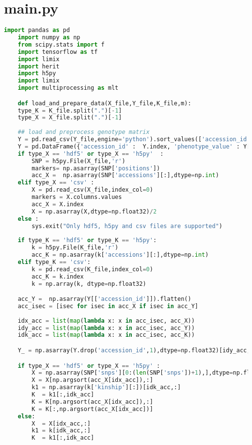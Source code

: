   \section{main.py}
  \begin{lstlisting}[language=Python]
    import pandas as pd 
    import numpy as np
    from scipy.stats import f
    import tensorflow as tf
    import limix
    import herit
    import h5py
    import limix
    import multiprocessing as mlt

    def load_and_prepare_data(X_file,Y_file,K_file,m):
    type_K = K_file.split(".")[-1]
    type_X = X_file.split(".")[-1]
    
    ## load and preprocess genotype matrix 
    Y = pd.read_csv(Y_file,engine='python').sort_values(['accession_id']).groupby('accession_id').mean()
    Y = pd.DataFrame({'accession_id' :  Y.index, 'phenotype_value' : Y[m]})
    if type_X == 'hdf5' or type_X == 'h5py'  :
        SNP = h5py.File(X_file,'r')
        markers= np.asarray(SNP['positions'])
        acc_X =  np.asarray(SNP['accessions'][:],dtype=np.int)
    elif type_X == 'csv' :
        X = pd.read_csv(X_file,index_col=0)
        markers = X.columns.values
        acc_X = X.index
        X = np.asarray(X,dtype=np.float32)/2
    else :
        sys.exit("Only hdf5, h5py and csv files are supported")
      
    if type_K == 'hdf5' or type_K == 'h5py':
        k = h5py.File(K_file,'r')
        acc_K = np.asarray(k['accessions'][:],dtype=np.int)
    elif type_K == 'csv':
        k = pd.read_csv(K_file,index_col=0)
        acc_K = k.index
        k = np.array(k, dtype=np.float32)

    acc_Y =  np.asarray(Y[['accession_id']]).flatten()
    acc_isec = [isec for isec in acc_X if isec in acc_Y]
        
    idx_acc = list(map(lambda x: x in acc_isec, acc_X))
    idy_acc = list(map(lambda x: x in acc_isec, acc_Y))
    idk_acc = list(map(lambda x: x in acc_isec, acc_K))

    Y_ = np.asarray(Y.drop('accession_id',1),dtype=np.float32)[idy_acc,:]

    if type_X == 'hdf5' or type_X == 'h5py' :
        X = np.asarray(SNP['snps'][0:(len(SNP['snps'])+1),],dtype=np.float32)[:,idx_acc].T
        X = X[np.argsort(acc_X[idx_acc]),:]
        k1 = np.asarray(k['kinship'][:])[idk_acc,:]
        K  = k1[:,idk_acc]
        K = K[np.argsort(acc_X[idx_acc]),:]
        K = K[:,np.argsort(acc_X[idx_acc])]
    else:
        X  = X[idx_acc,:]
        k1 = k[idk_acc,:]
        K  = k1[:,idk_acc]
        

\end{lstlisting}
